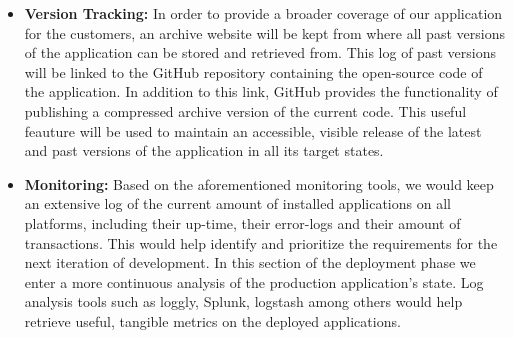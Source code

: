 \documentclass[12pt]{report}
\begin{document}
\begin{itemize}
\begin{itemize}
    \end{itemize}
    \item \textbf{Version Tracking:} In order to provide a broader coverage of our application for the customers, an archive website will be kept from where all past versions of the application can be stored and retrieved from. This log of past versions will be linked to the GitHub repository containing the open-source code of the application. In addition to this link, GitHub provides the functionality of publishing a compressed archive version of the current code. This useful feauture will be used to maintain an accessible, visible release of the latest and past versions of the application in all its target states.
    \item \textbf{Monitoring:} Based on the aforementioned monitoring tools, we would keep an extensive log of the current amount of installed applications on all platforms, including their up-time, their error-logs and their amount of transactions. This would help identify and prioritize the requirements for the next iteration of development. In this section of the deployment phase we enter a more continuous analysis of the production application's state. Log analysis tools such as loggly, Splunk, logstash among others would help retrieve useful, tangible metrics on the deployed applications.
\end{itemize}
\end{document}

